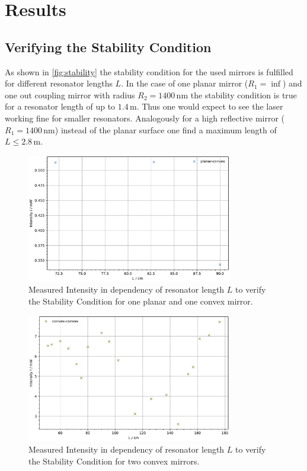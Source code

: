 \section{Results}


\subsection{Verifying the Stability Condition}
As shown in \autoref{fig:stability} the stability condition for the used mirrors is fulfilled for different resonator lengths $L$. In the case of one planar mirror ($R_1=\inf$) and one out coupling mirror with radius $R_2=1400\, \unit{\nano \meter}$ the stability condition is true for 
a resonator length of up to $1.4\, \unit{\meter}$. Thus one would expect to see the laser working fine for smaller resonators. Analogously for a high reflective mirror ($R_1=1400\, \unit{\nano \meter}$) instead of the planar surface one find a maximum length of $L\leq 2.8\, \unit{\meter}$.
\begin{figure}
	\centering
	\includegraphics[width=0.8\textwidth]{content/plots/stability2.pdf}
	\caption{Measured Intensity in dependency of resonator length $L$ to verify the Stability Condition for one planar and one convex mirror.}
	\label{fig:stability2}
\end{figure}
\begin{figure}
	\centering
	\includegraphics[width=0.8\textwidth]{content/plots/stability1.pdf}
	\caption{Measured Intensity in dependency of resonator length $L$ to verify the Stability Condition for two convex mirrors.}
	\label{fig:stability1}
\end{figure}
